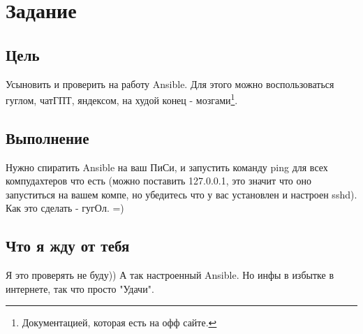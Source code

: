     \section{Задание}

        \subsection{Цель}
            Усыновить и проверить на работу Ansible. Для этого можно воспользоваться гуглом, чатГПТ, яндексом, на худой конец - мозгами\footnote{Документацией, которая есть на офф сайте.}.

        \subsection{Выполнение}
            Нужно спиратить Ansible на ваш ПиСи, и запустить команду ping для всех компудахтеров что есть (можно поставить 127.0.0.1, это значит что оно запуститься на вашем компе, но убедитесь что у вас установлен и настроен sshd). Как это сделать - гугОл. =)

        \subsection{Что я жду от тебя}
            Я это проверять не буду)) А так настроенный Ansible. Но инфы в избытке в интернете, так что просто "Удачи".


